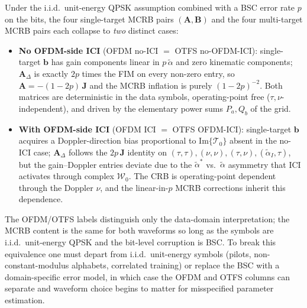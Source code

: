 \documentclass[11pt]{article}
\begin{document}
Under the i.i.d.\ unit-energy QPSK assumption combined with a BSC error rate \(p\) on the bits, the four single-target MCRB pairs \((\bm{A}, \bm{B})\) and the four multi-target MCRB pairs each collapse to \emph{two} distinct cases:
\begin{itemize}
    \item \textbf{No OFDM-side ICI} (OFDM no-ICI \(=\) OTFS no-OFDM-ICI): single-target \(\bm{b}\) has gain components linear in \(p\,\tilde{\alpha}\) and zero kinematic components; \(\bm{A}_\Delta\) is exactly \(2p\) times the FIM on every non-zero entry, so \(\bm{A} = -(1-2p)\, \bm{J}\) and the MCRB inflation is purely \((1-2p)^{-2}\). Both matrices are deterministic in the data symbols, operating-point free (\(\tau, \nu\)-independent), and driven by the elementary power sums \(P_a, Q_b\) of the grid.
    \item \textbf{With OFDM-side ICI} (OFDM ICI \(=\) OTFS OFDM-ICI): single-target \(\bm{b}\) acquires a Doppler-direction bias proportional to \(\mathrm{Im}\{\mathcal{T}_0\}\) absent in the no-ICI case; \(\bm{A}_\Delta\) follows the \(2p\, \bm{J}\) identity on \((\tau,\tau), (\nu,\nu), (\tau,\nu), (\tilde{\alpha}_I,\tau)\), but the gain--Doppler entries deviate due to the \(\tilde{\alpha}^*\) vs.\ \(\tilde{\alpha}\) asymmetry that ICI activates through complex \(\mathcal{W}_0\). The CRB is operating-point dependent through the Doppler \(\nu\), and the linear-in-\(p\) MCRB corrections inherit this dependence.
\end{itemize}
The OFDM/OTFS labels distinguish only the data-domain interpretation; the MCRB content is the same for both waveforms so long as the symbols are i.i.d.\ unit-energy QPSK and the bit-level corruption is BSC. To break this equivalence one must depart from i.i.d.\ unit-energy symbols (pilots, non-constant-modulus alphabets, correlated training) or replace the BSC with a domain-specific error model, in which case the OFDM and OTFS columns can separate and waveform choice begins to matter for misspecified parameter estimation.
\end{document}
